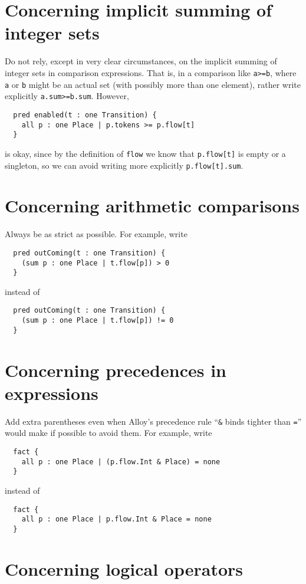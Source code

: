 \documentclass{article}
\begin{document}
\section*{Concerning implicit summing of integer sets}

Do not rely, except in very clear circumstances, on the implicit summing of integer sets in comparison expressions.
That is, in a comparison like \lstinline|a>=b|, where \lstinline|a| or \lstinline|b| might be an actual set (with possibly more than one element), rather write explicitly \lstinline|a.sum>=b.sum|.
However,
\begin{lstlisting}
  pred enabled(t : one Transition) {
    all p : one Place | p.tokens >= p.flow[t]
  }
\end{lstlisting}
is okay, since by the definition of \lstinline|flow| we know that \lstinline|p.flow[t]| is empty or a singleton, so we can avoid writing more explicitly \lstinline|p.flow[t].sum|.

\section*{Concerning arithmetic comparisons}

Always be as strict as possible.
For example, write
\begin{lstlisting}
  pred outComing(t : one Transition) {
    (sum p : one Place | t.flow[p]) > 0
  }
\end{lstlisting}
instead of
\begin{lstlisting}
  pred outComing(t : one Transition) {
    (sum p : one Place | t.flow[p]) != 0
  }
\end{lstlisting}

\section*{Concerning precedences in expressions}

Add extra parentheses even when Alloy's precedence rule ``\lstinline|&| binds tighter than \lstinline|=|'' would make if possible to avoid them.
For example, write
\begin{lstlisting}
  fact {
    all p : one Place | (p.flow.Int & Place) = none
  }
\end{lstlisting}
instead of
\begin{lstlisting}
  fact {
    all p : one Place | p.flow.Int & Place = none
  }
\end{lstlisting}

\section*{Concerning logical operators}
\end{document}
